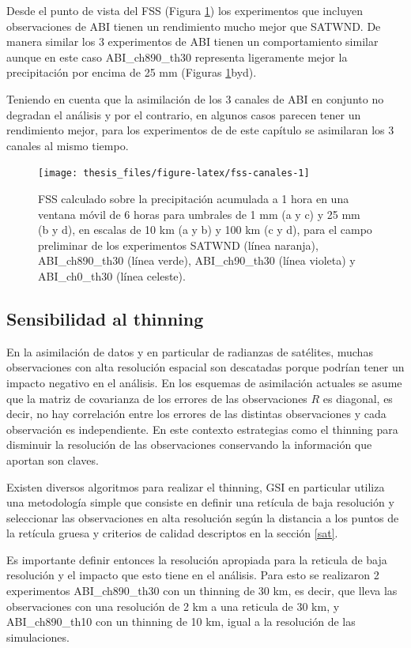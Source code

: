 \documentclass[12pt,oneside]{reedthesis}
\begin{document}
Desde el punto de vista del FSS (Figura \ref{fig:fss-canales}) los experimentos que incluyen observaciones de ABI tienen un rendimiento mucho mejor que SATWND. De manera similar los 3 experimentos de ABI tienen un comportamiento similar aunque en este caso ABI\_ch890\_th30 representa ligeramente mejor la precipitación por encima de 25 mm (Figuras \ref{fig:fss-canales}byd).

Teniendo en cuenta que la asimilación de los 3 canales de ABI en conjunto no degradan el análisis y por el contrario, en algunos casos parecen tener un rendimiento mejor, para los experimentos de de este capítulo se asimilaran los 3 canales al mismo tiempo.


\begin{figure}
\texttt{[image: thesis\_files/figure-latex/fss-canales-1]} \caption{FSS calculado sobre la precipitación acumulada a 1 hora en una ventana móvil de 6 horas para umbrales de 1 mm (a y c) y 25 mm (b y d), en escalas de 10 km (a y b) y 100 km (c y d), para el campo preliminar de los experimentos SATWND (línea naranja), ABI\_ch890\_th30 (línea verde), ABI\_ch90\_th30 (línea violeta) y ABI\_ch0\_th30 (línea celeste).}\label{fig:fss-canales}
\end{figure}
\hypertarget{thinning}{%
\subsection{Sensibilidad al thinning}\label{thinning}}

En la asimilación de datos y en particular de radianzas de satélites, muchas observaciones con alta resolución espacial son descatadas porque podrían tener un impacto negativo en el análisis. En los esquemas de asimilación actuales se asume que la matriz de covarianza de los errores de las observaciones \(R\) es diagonal, es decir, no hay correlación entre los errores de las distintas observaciones y cada observación es independiente. En este contexto estrategias como el thinning para disminuir la resolución de las observaciones conservando la información que aportan son claves.

Existen diversos algoritmos para realizar el thinning, GSI en particular utiliza una metodología simple que consiste en definir una retícula de baja resolución y seleccionar las observaciones en alta resolución según la distancia a los puntos de la retícula gruesa y criterios de calidad descriptos en la sección \ref{sat}.

Es importante definir entonces la resolución apropiada para la reticula de baja resolución y el impacto que esto tiene en el análisis. Para esto se realizaron 2 experimentos ABI\_ch890\_th30 con un thinning de 30 km, es decir, que lleva las observaciones con una resolución de 2 km a una reticula de 30 km, y ABI\_ch890\_th10 con un thinning de 10 km, igual a la resolución de las simulaciones.
\end{document}
